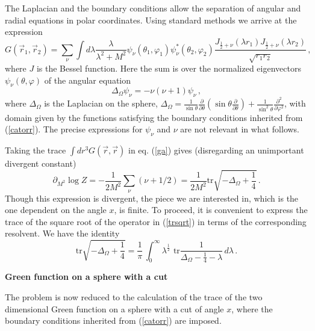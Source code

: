 \documentclass[a4paper]{article}
\begin{document}
The Laplacian and the boundary conditions allow the separation of angular and radial equations in polar coordinates. Using standard methods we arrive at the expression 
\begin{equation}
G(\vec{r}_1,\vec{r}_2)=\sum_\nu \int d\lambda \frac{\lambda}{\lambda^2+M^2}\psi_{\nu}( \theta_1 , \varphi_1)\psi^*_{\nu}(\theta_2 , \varphi_2)\frac{J_{\frac{1}{2}+\nu}(\lambda r_1)J_{\frac{1}{2}+\nu}(\lambda r_2)}{\sqrt{r_1 r_2}}\,,
\label{ga}
\end{equation}
where $J$ is the Bessel function. Here the sum is over the normalized eigenvectors $\psi_{\nu}(\theta , \varphi)$ of the angular equation 
\begin{equation}
\Delta_{\Omega}\psi_{\nu}=-\nu(\nu+1)\psi_{\nu}\,,
\end{equation}
where $\Delta_{\Omega}$ is the Laplacian on the sphere, 
 $
\Delta_{\Omega}=\frac{1}{\sin \theta}\frac{\partial}{\partial \theta}(\sin\theta\frac{\partial}{\partial \theta})+\frac{1}{\sin^2\theta}\frac{\partial^2}{\partial \varphi^2}
$, 
with domain given by the functions satisfying the boundary conditions inherited from (\ref{catorr}). 
 The precise expressions for $\psi_{\nu}$ and $\nu$ are not relevant in what follows.  




Taking the trace $\int dr^3 G(\vec{r},\vec{r})$ in eq. (\ref{ga}) gives (disregarding an unimportant divergent constant)
\begin{equation}
\partial_{M^2}\log Z=-\frac{1}{2M^2}\sum_{\nu}(\nu+1/2)=\frac{1}{2M^2}\textrm{tr}\sqrt{-\Delta_{\Omega}+\frac{1}{4}}\,.
\label{trsqrt}
\end{equation}
Though this expression is divergent, the piece we are interested in, which is the one dependent on the angle $x$, is finite. 
 To proceed, it is convenient to express the trace of the square root of the operator in (\ref{trsqrt}) in terms of the corresponding resolvent.  We have the identity \cite{seeley}  
\begin{equation}
\textrm{tr}  \sqrt{-\Delta_{\Omega}+\frac{1}{4}}=\frac{1}{\pi}\,\int_0^{\infty}\lambda^{\frac{1}{2}}\,\,\textrm{tr}\frac{1}{\Delta_{\Omega}-\frac{1}{4}-\lambda}\, d\lambda 
\,.
\label{tr}
\end{equation}

 

\smallskip 

\noindent\textbf{Green function on a sphere with a cut}

\noindent The problem is now reduced to the calculation of the trace of the two dimensional Green function on a sphere with a cut of angle $x$, where the boundary conditions inherited from (\ref{catorr}) are imposed. 
 
\end{document}
